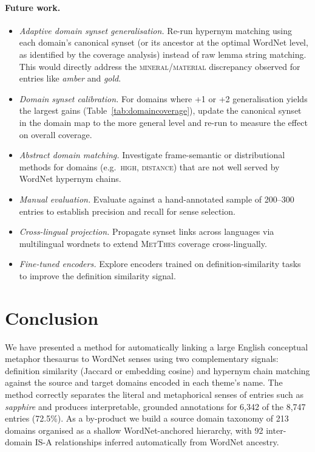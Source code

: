 \documentclass[11pt,a4paper]{article}
\begin{document}
\paragraph{Future work.}
\begin{itemize}
  \item \emph{Adaptive domain synset generalisation.}
    Re-run hypernym matching using each domain's canonical synset (or its
    ancestor at the optimal WordNet level, as identified by the coverage
    analysis) instead of raw lemma string matching.
    This would directly address the \textsc{mineral}/\textsc{material}
    discrepancy observed for entries like \emph{amber} and \emph{gold}.
  \item \emph{Domain synset calibration.}
    For domains where +1 or +2 generalisation yields the largest gains
    (Table~\ref{tab:domaincoverage}), update the canonical synset in the
    domain map to the more general level and re-run to measure the effect
    on overall coverage.
  \item \emph{Abstract domain matching.}
    Investigate frame-semantic or distributional methods for domains
    (e.g.\ \textsc{high}, \textsc{distance}) that are not well served by
    WordNet hypernym chains.
  \item \emph{Manual evaluation.}
    Evaluate against a hand-annotated sample of 200--300 entries to
    establish precision and recall for sense selection.
  \item \emph{Cross-lingual projection.}
    Propagate synset links across languages via multilingual wordnets to
    extend \textsc{MetThes} coverage cross-lingually.
  \item \emph{Fine-tuned encoders.}
    Explore encoders trained on definition-similarity tasks to improve
    the definition similarity signal.
\end{itemize}

\section{Conclusion}
\label{sec:conclusion}

We have presented a method for automatically linking a large English
conceptual metaphor thesaurus to WordNet senses using two complementary
signals: definition similarity (Jaccard or embedding cosine) and hypernym
chain matching against the source and target domains encoded in each
theme's name.
The method correctly separates the literal and metaphorical senses of
entries such as \emph{sapphire} and produces interpretable, grounded
annotations for 6,342 of the 8,747 entries (72.5\%).
As a by-product we build a source domain taxonomy of 213 domains
organised as a shallow WordNet-anchored hierarchy, with 92 inter-domain
IS-A relationships inferred automatically from WordNet ancestry.
\end{document}
